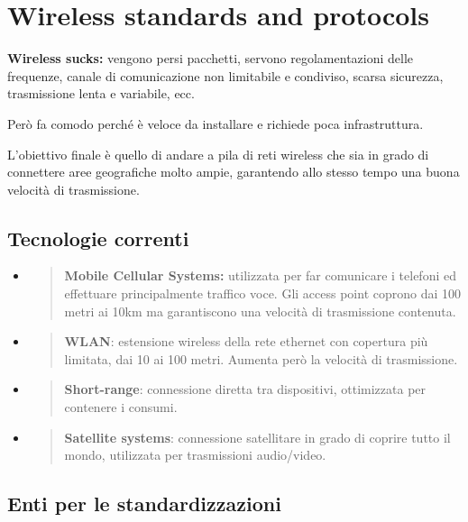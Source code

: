 \section{Wireless standards and
protocols}\label{wireless-standards-and-protocols}

\textbf{Wireless sucks:} vengono persi pacchetti, servono
regolamentazioni delle frequenze, canale di comunicazione non limitabile
e condiviso, scarsa sicurezza, trasmissione lenta e variabile, ecc.

Però fa comodo perché è veloce da installare e richiede poca
infrastruttura.

L'obiettivo finale è quello di andare a pila di reti wireless che sia in
grado di connettere aree geografiche molto ampie, garantendo allo stesso
tempo una buona velocità di trasmissione.

\subsection{Tecnologie correnti}\label{tecnologie-correnti}

\begin{itemize}
\item
  \begin{quote}
  \textbf{Mobile Cellular Systems:} utilizzata per far comunicare i
  telefoni ed effettuare principalmente traffico voce. Gli access point
  coprono dai 100 metri ai 10km ma garantiscono una velocità di
  trasmissione contenuta.
  \end{quote}
\item
  \begin{quote}
  \textbf{WLAN}: estensione wireless della rete ethernet con copertura
  più limitata, dai 10 ai 100 metri. Aumenta però la velocità di
  trasmissione.
  \end{quote}
\item
  \begin{quote}
  \textbf{Short-range}: connessione diretta tra dispositivi, ottimizzata
  per contenere i consumi.
  \end{quote}
\item
  \begin{quote}
  \textbf{Satellite systems}: connessione satellitare in grado di
  coprire tutto il mondo, utilizzata per trasmissioni audio/video.
  \end{quote}
\end{itemize}

\subsection{Enti per le
standardizzazioni}\label{enti-per-le-standardizzazioni}

